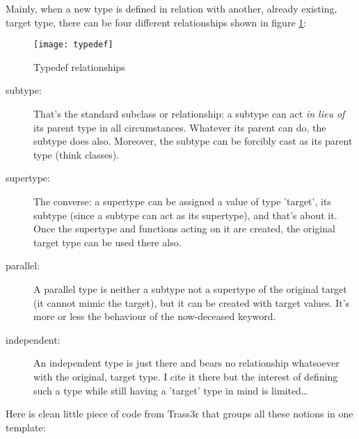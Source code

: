 Mainly, when a new type is defined in relation with another, already existing, target type, there can be four different relationships shown in figure \ref{fig:typedef}:

\begin{figure}[htb]
\centering
\texttt{[image: typedef]}
\caption{Typedef relationships}
\label{fig:typedef}
\end{figure}

\begin{description}
\item[subtype:] That's the standard subclass or  relationship: a subtype can act \emph{in lieu of} its parent type in all circumstances. Whatever its parent can do, the subtype does also. Moreover, the subtype can be forcibly cast as its parent type (think classes).
\item[supertype:] The converse: a supertype can be assigned a value of type 'target', its subtype (since a subtype can act as its supertype), and that's about it. Once the supertype and functions acting on it are created, the original target type can be used there also.
\item[parallel:] A parallel type is neither a subtype not a supertype of the original target (it cannot mimic the target), but it can be created with target values. It's more or less the behaviour of the now-deceased  keyword.
\item[independent:] An independent type is just there and bears no relationship whatsoever with the original, target type. I cite it there but the interest of defining such a type while still having a 'target' type in mind is limited\ldots
\end{description}

Here is clean little piece of code from Trass3r that groups all these notions in one template:

